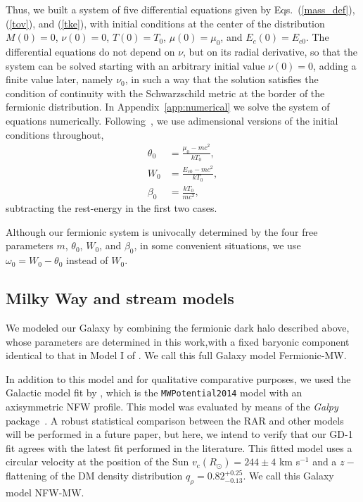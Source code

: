 \documentclass[twocolumn]{aa}
\begin{document}
Thus, we built a system of five differential equations given
by Eqs.~(\ref{mass_def}), (\ref{tov}), and (\ref{tke}), with initial conditions
at the center of the distribution $M(0)=0$, $\nu(0)=0$, $T(0)=T_0$,
$\mu(0)=\mu_0$, and $E_c(0)=E_{c0}$.
The differential equations do not depend on $\nu$, but on its radial
derivative, so that the system can be solved starting with an arbitrary initial value $\nu(0)=0$, adding a finite value later, namely $\nu_0$, in such a way that the solution satisfies the condition of continuity with the Schwarzschild metric at the border of the fermionic distribution. In Appendix~\ref{app:numerical} we solve the system of equations numerically. Following~\cite{arguelles_novel_2018}, we use adimensional versions of the initial conditions throughout,
\begin{align}
    \theta_0 &= \frac{\mu_0 - mc^2}{kT_0},\nonumber\\
    W_0 &= \frac{E_{c0} - mc^2}{kT_0},\nonumber\\
    \beta_0 &= \frac{kT_0}{mc^2},\label{rar_params}
\end{align}
subtracting the rest-energy in the first two cases.

Although our fermionic system is univocally determined by the four free parameters $m$, $\theta_0$, $W_0$, and $\beta_0$, in some convenient situations, we use $\omega_0=W_0-\theta_0$ instead of $W_0$.




\subsection{Milky Way and stream models}
\label{sec:MW_stream_models}

We modeled our Galaxy by combining the fermionic dark halo described above, whose parameters are determined in this work,with a fixed baryonic component identical to that in Model I of \citet{2017A&A...598A..66P}. We call this full Galaxy model Fermionic-MW.

In addition to this model and for qualitative comparative purposes, we used the Galactic model fit by \citet{2019MNRAS.486.2995M}, which is the {\texttt{MWPotential2014}} model with an axisymmetric NFW profile. This model was evaluated by means of the {\it Galpy} package~\citep{2015ApJS..216...29B}. A robust statistical comparison between the RAR and other models will be performed in a future paper, but here, we intend to verify that our GD-1 fit agrees with the latest fit performed in the literature. This fitted model uses a circular velocity at the position of the Sun $v_\mathrm{c}(R_\odot)=244 \pm 4$ km s$^{-1}$ and a $z-$flattening of the DM density distribution  $q_\rho=0.82^{+0.25}_{-0.13}$. We call this Galaxy model NFW-MW.
\end{document}
